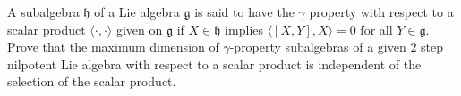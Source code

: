A subalgebra $\mathfrak{h}$ of a Lie algebra $\mathfrak g$ is said to have the $\gamma$ property with respect to a scalar product ${\langle \cdot,\cdot \rangle}$ given on ${\mathfrak g}$ if ${X \in \mathfrak{h}}$ implies ${\langle [X,Y],X\rangle =0}$ for all ${Y \in \mathfrak g}$. Prove that the maximum dimension of ${\gamma}$-property subalgebras of a given ${2}$ step nilpotent Lie algebra with respect to a scalar product is independent of the selection of the scalar product.

